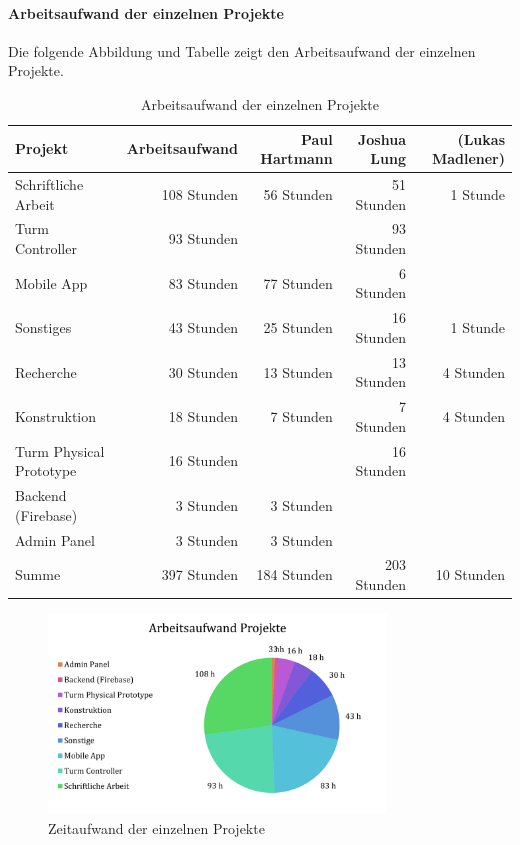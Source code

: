 \paragraph{Arbeitsaufwand der einzelnen Projekte}
Die folgende Abbildung und Tabelle zeigt den Arbeitsaufwand der einzelnen Projekte.

\begin{table}[H]
  \centering
  \small
  \begin{tabular}{lrrrr}
    \toprule
    \textbf{Projekt}        & \textbf{Arbeitsaufwand} & \textbf{Paul Hartmann} & \textbf{Joshua Lung} & \textbf{(Lukas Madlener)} \\
    \midrule
    Schriftliche Arbeit     & 108 Stunden             & 56 Stunden             & 51 Stunden           & 1 Stunde                  \\
    Turm Controller         & 93 Stunden              &                        & 93 Stunden           &                           \\
    Mobile App              & 83 Stunden              & 77 Stunden             & 6 Stunden            &                           \\
    Sonstiges               & 43 Stunden              & 25 Stunden             & 16 Stunden           & 1 Stunde                  \\
    Recherche               & 30 Stunden              & 13 Stunden             & 13 Stunden           & 4 Stunden                 \\
    Konstruktion            & 18 Stunden              & 7 Stunden              & 7 Stunden            & 4 Stunden                 \\
    Turm Physical Prototype & 16 Stunden              &                        & 16 Stunden           &                           \\
    Backend (Firebase)      & 3 Stunden               & 3 Stunden              &                      &                           \\
    Admin Panel             & 3 Stunden               & 3 Stunden              &                      &                           \\
    \midrule
    Summe                   & 397 Stunden             & 184 Stunden            & 203 Stunden          & 10 Stunden                \\
    \bottomrule
  \end{tabular}
  \caption{Arbeitsaufwand der einzelnen Projekte}
  \label{tab:zeiterfassung_projekte}
\end{table}

\begin{figure}[H]
  \centering
  \includegraphics[width=0.8\textwidth]{images/zeiterfassung_projekte.png}
  \caption{Zeitaufwand der einzelnen Projekte}
  \label{fig:zeiterfassung_projekte}
\end{figure}